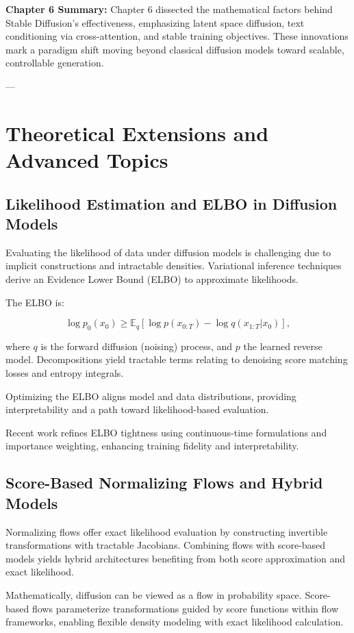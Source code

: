 \textbf{Chapter 6 Summary:}  
Chapter 6 dissected the mathematical factors behind Stable Diffusion’s effectiveness, emphasizing latent space diffusion, text conditioning via cross-attention, and stable training objectives. These innovations mark a paradigm shift moving beyond classical diffusion models toward scalable, controllable generation.

---

\chapter{Theoretical Extensions and Advanced Topics}

\section{Likelihood Estimation and ELBO in Diffusion Models}

Evaluating the likelihood of data under diffusion models is challenging due to implicit constructions and intractable densities. Variational inference techniques derive an Evidence Lower Bound (ELBO) to approximate likelihoods.

The ELBO is:

\[
\log p_0(x_0) \geq \mathbb{E}_{q} \left[ \log p(x_{0:T}) - \log q(x_{1:T}|x_0) \right],
\]

where \( q \) is the forward diffusion (noising) process, and \( p \) the learned reverse model. Decompositions yield tractable terms relating to denoising score matching losses and entropy integrals.

Optimizing the ELBO aligns model and data distributions, providing interpretability and a path toward likelihood-based evaluation.

Recent work refines ELBO tightness using continuous-time formulations and importance weighting, enhancing training fidelity and interpretability.

\section{Score-Based Normalizing Flows and Hybrid Models}

Normalizing flows offer exact likelihood evaluation by constructing invertible transformations with tractable Jacobians. Combining flows with score-based models yields hybrid architectures benefiting from both score approximation and exact likelihood.

Mathematically, diffusion can be viewed as a flow in probability space. Score-based flows parameterize transformations guided by score functions within flow frameworks, enabling flexible density modeling with exact likelihood calculation.

